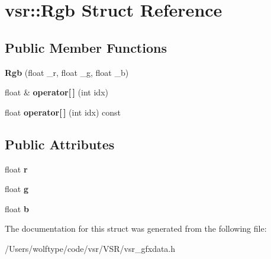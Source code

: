 \hypertarget{structvsr_1_1_rgb}{\section{vsr\-:\-:Rgb Struct Reference}
\label{structvsr_1_1_rgb}
}
\subsection*{Public Member Functions}
\begin{DoxyCompactItemize}
\item 
\hypertarget{structvsr_1_1_rgb_a7821c6aa651c5fcd3634c639c7725a26}{{\bfseries Rgb} (float \-\_\-r, float \-\_\-g, float \-\_\-b)}\label{structvsr_1_1_rgb_a7821c6aa651c5fcd3634c639c7725a26}

\item 
\hypertarget{structvsr_1_1_rgb_a2737e95e2c2c821e6afdeabe5ae01801}{float \& {\bfseries operator\mbox{[}$\,$\mbox{]}} (int idx)}\label{structvsr_1_1_rgb_a2737e95e2c2c821e6afdeabe5ae01801}

\item 
\hypertarget{structvsr_1_1_rgb_a6aa7afb4cbfd4b7e5f6237009046426b}{float {\bfseries operator\mbox{[}$\,$\mbox{]}} (int idx) const }\label{structvsr_1_1_rgb_a6aa7afb4cbfd4b7e5f6237009046426b}

\end{DoxyCompactItemize}
\subsection*{Public Attributes}
\begin{DoxyCompactItemize}
\item 
\hypertarget{structvsr_1_1_rgb_a81d3c7696159c304a4c31f9dfb4ddef7}{float {\bfseries r}}\label{structvsr_1_1_rgb_a81d3c7696159c304a4c31f9dfb4ddef7}

\item 
\hypertarget{structvsr_1_1_rgb_a5dd636c5f0e5c03d23f760d8512f1b37}{float {\bfseries g}}\label{structvsr_1_1_rgb_a5dd636c5f0e5c03d23f760d8512f1b37}

\item 
\hypertarget{structvsr_1_1_rgb_add514e391502944dea265eba590f85de}{float {\bfseries b}}\label{structvsr_1_1_rgb_add514e391502944dea265eba590f85de}

\end{DoxyCompactItemize}


The documentation for this struct was generated from the following file\-:\begin{DoxyCompactItemize}
\item 
/\-Users/wolftype/code/vsr/\-V\-S\-R/vsr\-\_\-gfxdata.\-h\end{DoxyCompactItemize}
